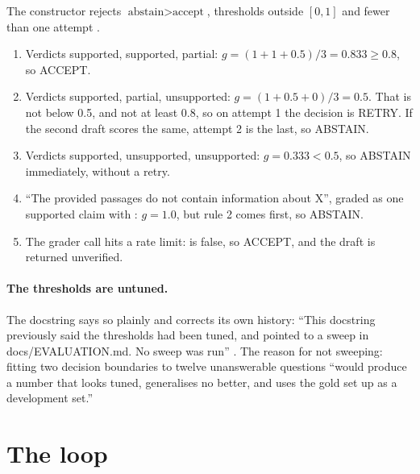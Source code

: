 The constructor rejects $\text{abstain} > \text{accept}$, thresholds outside $[0,1]$ and fewer than one attempt .

\begin{example}
\begin{enumerate}
  \item Verdicts supported, supported, partial: $g = (1+1+0.5)/3 = 0.833 \ge 0.8$, so ACCEPT.
  \item Verdicts supported, partial, unsupported: $g = (1+0.5+0)/3 = 0.5$. That is not below 0.5, and not at least 0.8, so on attempt 1 the decision is RETRY. If the second draft scores the same, attempt 2 is the last, so ABSTAIN.
  \item Verdicts supported, unsupported, unsupported: $g = 0.333 < 0.5$, so ABSTAIN immediately, without a retry.
  \item \enquote{The provided passages do not contain information about X}, graded as one supported claim with : $g = 1.0$, but rule 2 comes first, so ABSTAIN.
  \item The grader call hits a rate limit:  is false, so ACCEPT, and the draft is returned unverified.
\end{enumerate}
\end{example}

\paragraph{The thresholds are untuned.} The docstring says so plainly and corrects its own history: \enquote{This docstring previously said the thresholds had been tuned, and pointed to a sweep in docs/EVALUATION.md. No sweep was run} . The reason for not sweeping: fitting two decision boundaries to twelve unanswerable questions \enquote{would produce a number that looks tuned, generalises no better, and uses the gold set up as a development set.}

\section{The loop}
\label{sec:loop}

